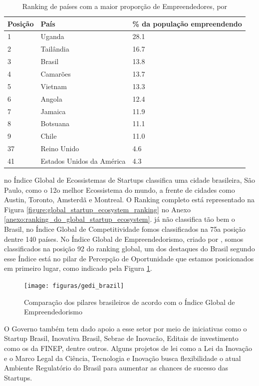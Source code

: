 \begin{table}[!htb]
	\centering
	\begin{tabular}{ | p{3cm} | p{8cm} | p{4cm} | }
		\hline
		Posição & País & \% da população empreendendo \\ \hline
		1 & Uganda & 28.1 \\ \hline
		2 & Tailândia & 16.7 \\ \hline
		3 & Brasil & 13.8 \\ \hline
		4 & Camarões & 13.7 \\ \hline
		5 & Vietnam & 13.3 \\ \hline
		6 & Angola & 12.4 \\ \hline
		7 & Jamaica & 11.9 \\ \hline
		8 & Botsuana & 11.1 \\ \hline
		9 & Chile & 11.0 \\ \hline
		37 & Reino Unido & 4.6 \\ \hline
		41 & Estados Unidos da América & 4.3 \\ \hline
	\end{tabular}
	\caption{Ranking de países com a maior proporção de Empreendedores, por \cite{Brinded2015}}	\label{table:ranking_de_paises_com_mais_empreendedores}
\end{table}

 no Índice Global de Ecossistemas de Startups classifica uma cidade brasileira, São Paulo, como o 12o melhor Ecossistema do mundo, a frente de cidades como Austin, Toronto, Amsterdã e Montreal. O Ranking completo está representado na Figura \ref{figure:global_startup_ecosystem_ranking} no Anexo \ref{anexo:ranking_do_global_startup_ecosystem}.  já não classifica tão bem o Brasil, no Índice Global de Competitividade fomos classificados na 75a posição dentre 140 países. No Índice Global de Empreendedorismo, criado por , somos classificados na posição 92 do ranking global, um dos destaques do Brasil segundo esse Índice está no pilar de Percepção de Oportunidade que estamos posicionados em primeiro lugar, como indicado pela Figura \ref{figure:gedi_brazil}.

\begin{figure}[!htb]
	\centering
	\texttt{[image: figuras/gedi\_brazil]}
	\caption{Comparação dos pilares brasileiros de acordo com o Índice Global de Empreendedorismo}
	\label{figure:gedi_brazil}
\end{figure}

O Governo também tem dado apoio a esse setor por meio de iniciativas como o Startup Brasil, Inovativa Brasil, Sebrae de Inovacão, Editais de investimento como os da FINEP, dentre outros. Alguns projetos de lei como a Lei da Inovação e o Marco Legal da Ciência, Tecnologia e Inovação busca flexibilidade o atual Ambiente Regulatório do Brasil para aumentar as chances de sucesso das Startups. 

